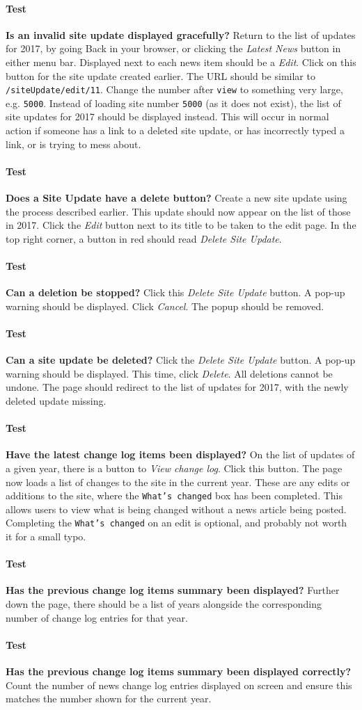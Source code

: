 \documentclass[12pt]{article}
\newcounter{Test}
\newcommand{\test}[1]{%
\stepcounter{Test}%
\paragraph{Test \theTest} \textbf{#1} }
\begin{document}
\test{Is an invalid site update displayed gracefully?}
Return to the list of updates for 2017, by going Back in your browser, or clicking the \textit{Latest News} button in either menu bar. Displayed next to each news item should be a \textit{Edit}. Click on this button for the site update created earlier. The URL should be similar to \texttt{/siteUpdate/edit/11}. Change the number after \texttt{view} to something very large, e.g. \texttt{5000}. Instead of loading site number \texttt{5000} (as it does not exist), the list of site updates for 2017 should be displayed instead. This will occur in normal action if someone has a link to a deleted site update, or has incorrectly typed a link, or is trying to mess about.

\test{Does a Site Update have a delete button?}
Create a new site update using the process described earlier. This update should now appear on the list of those in 2017. Click the \textit{Edit} button next to its title to be taken to the edit page. In the top right corner, a button in red should read \textit{Delete Site Update}.

\test{Can a deletion be stopped?}
Click this \textit{Delete Site Update} button. A pop-up warning should be displayed. Click \textit{Cancel}. The popup should be removed.

\test{Can a site update be deleted?}
Click the \textit{Delete Site Update} button. A pop-up warning should be displayed. This time, click \textit{Delete}. All deletions cannot be undone. The page should redirect to the list of updates for 2017, with the newly deleted update missing.

\test{Have the latest change log items been displayed?}
On the list of updates of a given year, there is a button to \textit{View change log}. Click this button. The page now loads a list of changes to the site in the current year. These are any edits or additions to the site, where the \texttt{What's changed} box has been completed. This allows users to view what is being changed without a news article being posted. Completing the \texttt{What's changed} on an edit is optional, and probably not worth it for a small typo.

\test{Has the previous change log items summary been displayed?}
Further down the page, there should be a list of years alongside the corresponding number of change log entries for that year.

\test{Has the previous change log items summary been displayed correctly?}
Count the number of news change log entries displayed on screen and ensure this matches the number shown for the current year.
\end{document}
